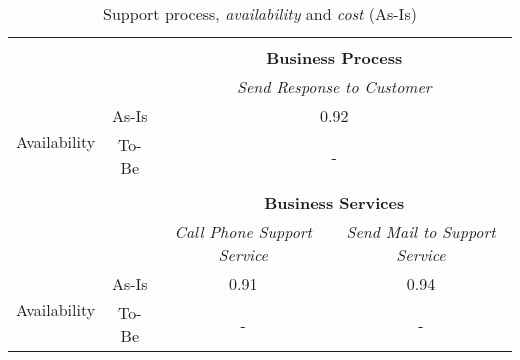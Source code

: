 \begin{table}[H]
\begin{tabular}{|c|c|p{2cm}|p{2.5cm}|p{2.5cm}|p{2.5cm}|}
		\multicolumn{6}{c}{} \\ \cline{3-6}
		\multicolumn{2}{c}{} & \multicolumn{4}{|c|}{\textbf{Business Process}} \\ \cline{3-6}
		\multicolumn{2}{c|}{} & \multicolumn{4}{|c|}{\textsl{Send Response to Customer}}\\ \hline
		\multirow{2}{*}{Availability} & As-Is & \multicolumn{4}{|c|}{0.92}\\ \cline{2-6}
									   & To-Be & \multicolumn{4}{|c|}{-}\\ \hline
		\multicolumn{6}{c}{} \\ \cline{3-6}
		\multicolumn{2}{c}{} & \multicolumn{4}{|c|}{\textbf{Business Services}} \\ \cline{3-6}
		\multicolumn{2}{c|}{} & \multicolumn{2}{|c|}{\textsl{Call Phone Support Service}} & \multicolumn{2}{|c|}{\textsl{Send Mail to Support Service}}\\ \hline
		\multirow{2}{*}{Availability} & As-Is & \multicolumn{2}{|c|}{0.91} & \multicolumn{2}{|c|}{0.94}\\ \cline{2-6}
									   & To-Be & \multicolumn{2}{|c|}{-} & \multicolumn{2}{|c|}{-}\\ \hline
	\end{tabular}
\caption{Support process, \textsl{availability} and \textsl{cost} (As-Is)} 
\label{tab:support_as_is}
\end{table}